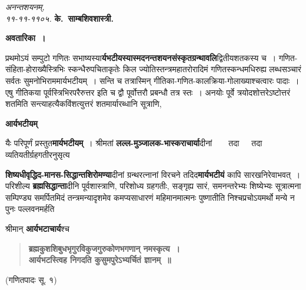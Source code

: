 \documentclass[11pt, openany]{book}
\begin{document}
\noindent \emph{अनन्तशयनम्,}\\
\noindent \emph{११-११-११०५.}\hspace{5.9cm}  \textbf{के.~साम्बशिवशास्त्री.}

\newpage

\begin{center}
\textbf{अवतारिका~।}
\end{center}
\thispagestyle{empty} 
\begin{sloppypar} 
प्रथमोऽयं सम्पुटो गणितः सभाष्यस्या\textbf{र्यभटीयस्यास्मदनन्तशयनसंस्कृतग्रन्थावलि}द्वितीयशतकस्य च~। गणित-संहिता-होराख्यैस्त्रिभिः
स्कन्धैरुपचिताकृतेः किल ज्योतिस्तन्त्रमहातरोरादिमं गणितस्कन्धमधिरुह्य लब्धसञ्चारं सर्वतः सुमनोभिराममार्यभटीयम्~। सन्ति च तत्रास्मिन् गीतिका-गणित-कालक्रिया-गोलाख्याश्चत्वारः पादाः~। एषु गीतिकया पूर्वस्त्रिभिरपरैरुत्तर इति च द्वौ पूर्वोत्तरौ प्रबन्धौ तत्र स्तः~। अनयोः पूर्वे
त्रयोदशोत्तरेऽष्टोत्तरं शतमिति सन्त्याहत्यैकविंशत्युत्तरं शतमार्यारब्धानि सूत्राणि,
\end{sloppypar} 
\begin{minipage}[t]{0.15\textwidth}
\vspace{.01cm}
\textbf{आर्यभटीयम्}
\end{minipage} 
\begin{minipage}[t]{0.55\textwidth} 
यैः परिपूर्णं प्रस्तुत\textbf{मार्यभटीयम्}~। श्रीमतां \textbf{लल्ल-मुञ्जालक-भास्कराचार्या}दीनां~~~~तदा~~~तदा व्यतियतीर्ग्रहगतीरनुसृत्य 
\end{minipage} 
\begin{sloppypar} 
\noindent \textbf{शिष्यधीवृद्धिद-मानस-सिद्धान्तशिरोमण्या}दीनां ग्रन्थरत्नानां विरचने तदिद\textbf{मार्यभटीयं} कापि सारखनिरेवाभवत्~। परिशील्य \textbf{ब्रह्मसिद्धान्ता}दीनि पूर्वशास्त्राणि, परिशोध्य ग्रहगतीः, सङ्गृह्य सारं, समनन्तरेभ्यः शिष्येभ्यः सूत्रात्मना सम्पिण्ड्य समर्पितमिदं तन्त्रमन्यादृशमेव कमप्यसाधारणं महिमानमात्मनः पुष्णातीति निश्चप्रचोऽयमर्थो मन्ये न पुनः पल्लवनमर्हति\\
\end{sloppypar} 
\noindent श्रीमान् \textbf{आर्यभटाचार्य}श्च\textendash 

\begin{quote}
\textbf{ब्रह्मकुशशिबुधभृगुरविकुजगुरुकोणभगणान् नमस्कृत्य~।\\
आर्यभटस्त्विह निगदति कुसुमपुरेऽभ्यर्चितं ज्ञानम्~॥} 
\end{quote}
\vspace{-2mm}
\hspace{8cm} (गणितपादः सू. १)
\end{document}
